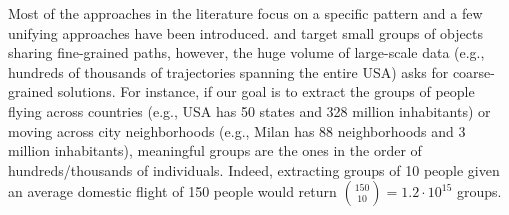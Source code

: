 \documentclass[
]{ceurart}
\begin{document}
Most of the approaches in the literature focus on a specific pattern and a few unifying approaches have been introduced.
\cite{DBLP:journals/ijitdm/PhanPT16} and \cite{DBLP:journals/pvldb/FanZWT16} target small groups of objects sharing fine-grained paths, however, the huge volume of large-scale data (e.g., hundreds of thousands of trajectories spanning the entire USA) asks for coarse-grained solutions.
For instance, if our goal is to extract the groups of people flying across countries (e.g., USA has 50 states and 328 million inhabitants) or moving across city neighborhoods (e.g., Milan has 88 neighborhoods and 3 million inhabitants), meaningful groups are the ones in the order of hundreds/thousands of individuals. 
Indeed, extracting groups of 10 people given an average domestic flight of 150 people would return $\binom{150}{10} = 1.2 \cdot 10^{15}$ groups.


\end{document}
